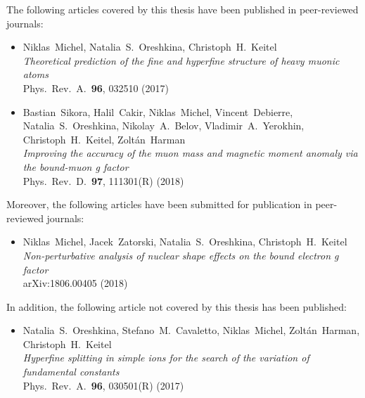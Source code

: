 \ifthispageodd{}{\cleardoublepage}


\noindent \normalfont
The following articles covered by this thesis have been published in peer-reviewed \\journals:

\begin{itemize}
\item Niklas~Michel, Natalia~S.~Oreshkina, Christoph~H.~Keitel \\ 
\textit{Theoretical prediction of the fine and hyperfine structure of heavy muonic atoms} \\ 
Phys.~Rev.~A.~\textbf{96}, 032510 (2017) \vspace*{5pt} \\
%
\item Bastian~Sikora, Halil~Cakir, Niklas~Michel, Vincent~Debierre, Natalia~S.~Oreshkina, Nikolay~A.~Belov, Vladimir~A.~Yerokhin, Christoph~H.~Keitel, Zoltán~Harman \\ 
\textit{Improving the accuracy of the muon mass and magnetic moment anomaly via the bound-muon g factor} \\ 
Phys.~Rev.~D.~\textbf{97}, 111301(R) (2018) \vspace*{5pt} \\
\end{itemize} 

\vspace{1.5cm}

\noindent
Moreover, the following articles have been submitted for publication in peer-reviewed journals:
\begin{itemize}
\item Niklas~Michel, Jacek~Zatorski, Natalia~S.~Oreshkina, Christoph~H.~Keitel \\ 
\textit{Non-perturbative analysis of nuclear shape effects on the bound electron g factor}\\
arXiv:1806.00405 (2018)
\end{itemize} 

\vspace{1.5cm}

\noindent
In addition, the following article not covered by this thesis has been published:

\begin{itemize}
\item Natalia~S.~Oreshkina, Stefano~M.~Cavaletto, Niklas~Michel, Zoltán~Harman,\\Christoph~H.~Keitel \\ 
\textit{Hyperfine splitting in simple ions for the search of the variation of fundamental constants} \\ 
Phys.~Rev.~A.~\textbf{96}, 030501(R) (2017) \vspace*{5pt} \\
\end{itemize} 

\thispagestyle{empty}
